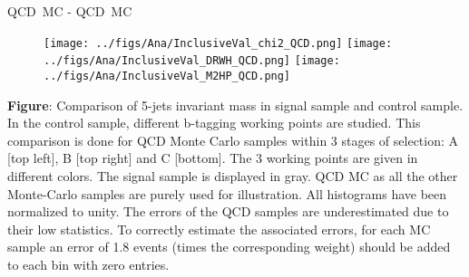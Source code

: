 \begin{frame}{QCD~MC - QCD~MC}
\vspace{-.2cm}
\begin{figure}[!Hhtbp]
  \begin{center}
    \texttt{[image: ../figs/Ana/InclusiveVal\_chi2\_QCD.png]}
    \texttt{[image: ../figs/Ana/InclusiveVal\_DRWH\_QCD.png]}
    \texttt{[image: ../figs/Ana/InclusiveVal\_M2HP\_QCD.png]}
  \end{center}
\end{figure}

\vspace{-.2cm}
    \begin{block}{}\tiny
      \textbf{Figure}: Comparison of 5-jets invariant mass in signal sample and control sample. In the control sample, different b-tagging working points are studied. This comparison is done for QCD Monte Carlo samples within 3 stages of selection: A [top left], B [top right] and C [bottom]. The 3 working points are given in different colors. The signal sample is displayed in gray. QCD MC as all the other Monte-Carlo samples are purely used for illustration. All histograms have been normalized to unity. The errors of the QCD samples are underestimated due to their low statistics. To correctly estimate the associated errors, for each MC sample an error of 1.8 events (times the corresponding weight) should be added to each bin with zero entries.
    \end{block}

\end{frame}

